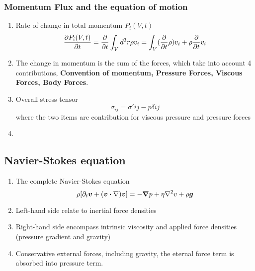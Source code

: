 \documentclass[12pt,a4paper]{article}
\begin{document}
        \subsubsection{Momentum Flux and the equation of motion}
            \begin{enumerate}
                \item Rate of change in total momentum $P_i(V,t)$
                \begin{equation}
                    \pdv{P_i(V,t)}{t}=\pdv{t} \int_{V}d^3r\rho v_i=\int_{V}(\pdv{t}\rho) v_i+\rho\pdv{t}v_i
                \end{equation}
                \item The change in momentum is the sum of the forces, which take into account 4 contributions, \textbf{Convention of momentum, Pressure Forces, Viscous Forces, Body Forces}.
                \item Overall stress tensor 
                \begin{equation}
                    \sigma_{ij}=\sigma' {ij} - p\delta{ij}
                \end{equation}
                where the two items are contribution for viscous pressure and pressure forces
                \item 
            \end{enumerate}
        \subsection{Navier-Stokes equation}
            \begin{enumerate}
                \item The complete Navier-Stokes equation
                \begin{equation}
                    \rho [\partial_t\vb*{v} + (\vb*{v}\dotproduct \nabla)\vb*{v}]= - \grad{p} +\eta\laplacian{v}+\rho\vb*{g}
                \end{equation}
                \item Left-hand side relate to inertial force densities
                \item Right-hand side encompass intrinsic viscosity and applied force densities (pressure gradient and gravity)
                \item Conservative external forces, including gravity, the eternal force term is absorbed into pressure term.
            \end{enumerate}
\end{document}
